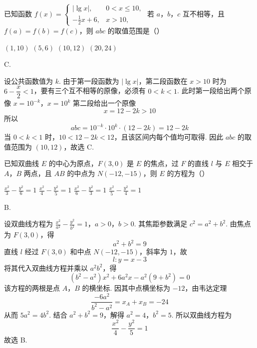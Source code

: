 \begin{problem}
已知函数 \( f(x) = \begin{cases}
|\lg x|, & 0 < x \leqslant 10,\\
- \frac{1}{2} x + 6, & x > 10,
\end{cases} \) 若 \(a\)，\(b\)，\(c\) 互不相等，且 \( f(a) = f(b) = f(c) \)，则 \( abc \) 的取值范围是（\quad）

\choices
    {\((1,10)\)}
    {\((5,6)\)}
    {\((10,12)\)}
    {\((20,24)\)}
\end{problem}

\begin{answer}
C.
\end{answer}

\begin{solution}
设公共函数值为 \(k\). 由于第一段函数为 \(|\lg x|\)，第二段函数在 \(x>10\) 时为 \(6-\dfrac x2<1\)，要有三个互不相等的原像，必须有 \(0<k<1\). 此时第一段给出两个原像
\(x=10^{-k}\)，\(x=10^k\)
第二段给出一个原像
\[
x=12-2k>10
\]
所以
\[
abc=10^{-k}\cdot10^k\cdot(12-2k)=12-2k
\]
当 \(0<k<1\) 时，\(10<12-2k<12\)，且该区间内每个值均可取得. 因此 \(abc\) 的取值范围为 \((10,12)\)，故选 C.
\end{solution}

\begin{problem}
已知双曲线 \(E\) 的中心为原点，\(F(3,0)\) 是 \(E\) 的焦点，过 \(F\) 的直线 \(l\) 与 \(E\) 相交于 \(A\)，\(B\) 两点，且 \(AB\) 的中点为 \(N(-12, -15)\)，则 \(E\) 的方程为（\quad）

\choices
    {\(\frac{x^2}{3} - \frac{y^2}{6} = 1\)}
    {\(\frac{x^2}{4} - \frac{y^2}{5} = 1\)}
    {\(\frac{x^2}{6} - \frac{y^2}{3} = 1\)}
    {\(\frac{x^2}{5} - \frac{y^2}{4} = 1\)}
\end{problem}

\begin{answer}
B.
\end{answer}

\begin{solution}
设双曲线方程为
\(\frac{x^2}{a^2}-\frac{y^2}{b^2}=1\)，\(a>0\)，\(b>0\).
其焦距参数满足 \(c^2=a^2+b^2\). 由焦点为 \(F(3,0)\)，得
\[
a^2+b^2=9
\]
直线 \(l\) 经过 \(F(3,0)\) 和中点 \(N(-12,-15)\)，斜率为 \(1\)，故
\[
l:y=x-3
\]
将其代入双曲线方程并乘以 \(a^2b^2\)，得
\[
(b^2-a^2)x^2+6a^2x-a^2(9+b^2)=0
\]
该方程的两根是点 \(A\)，\(B\) 的横坐标. 因其中点横坐标为 \(-12\)，由韦达定理
\[
\frac{-6a^2}{b^2-a^2}=x_A+x_B=-24
\]
从而 \(5a^2=4b^2\). 结合 \(a^2+b^2=9\)，解得
\(a^2=4\)，\(b^2=5\).
所以双曲线方程为
\[
\frac{x^2}{4}-\frac{y^2}{5}=1
\]
故选 B.
\end{solution}

